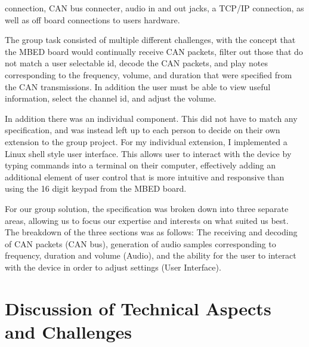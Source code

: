 connection, CAN bus connecter, audio in and out jacks, a TCP/IP connection, as 
well as off board connections to users hardware. 
\par\bigskip\noindent
The group task consisted of multiple different challenges, with the concept
that the MBED board would continually receive CAN packets, filter out those 
that do not match a user selectable id, decode the CAN packets, and play notes 
corresponding to the frequency, volume, and duration that were specified from 
the CAN transmissions. In addition the user must be able to view useful 
information, select the channel id, and adjust the volume. 
\par\bigskip\noindent
In addition there was an individual component. This did not have to match any 
specification, and was instead left up to each person to decide on their own 
extension to the group project. For my individual extension, I implemented a 
Linux shell style user interface. This allows user to interact with the device 
by typing commands into a terminal on their computer, effectively adding an 
additional element of user control that is more intuitive and responsive than 
using the 16 digit keypad from the MBED board.
\par\bigskip\noindent
For our group solution, the specification was broken down into three separate 
areas, allowing us to focus our expertise and interests on what suited us best.
The breakdown of the three sections was as follows: The receiving and 
decoding of CAN packets (CAN bus), generation of audio samples corresponding to 
frequency, duration and volume (Audio), and the ability for the user to 
interact with the device in order to adjust settings (User Interface). 

\section{Discussion of Technical Aspects and Challenges}

